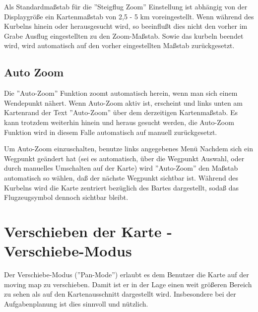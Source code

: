 Als Standardmaßstab für die ''Steigflug Zoom'' Einstellung ist abhängig  von der Displaygröße ein Kartenmaßstab von 2,5 - 5 km voreingestellt.
Wenn während des Kurbelns hinein oder herausgesucht wird, so beeinflußt dies nicht den vorher im Grabe Ausflug eingestellten zu den Zoom-Maßstab. Sowie das kurbeln beendet wird, wird automatisch auf den vorher eingestellten Maßstab zurückgesetzt.
\subsection*{Auto Zoom}\label{sec:AutoZoom}
Die ''Auto-Zoom'' Funktion zoomt automatisch herein, wenn man sich einem Wendepunkt nähert.
Wenn Auto-Zoom aktiv ist, erscheint und links unten am Kartenrand der Text ''Auto-Zoom'' über dem derzeitigen Kartenmaßstab.
Es kann trotzdem weiterhin hinein und heraus gesucht werden, die Auto-Zoom Funktion wird in diesem Falle automatisch auf manuell zurückgesetzt.

Um Auto-Zoom einzuschalten, benutze links angegebenes Menü
Nachdem sich ein Wegpunkt geändert hat (sei es automatisch, über die Wegpunkt Auswahl, oder durch manuelles Umschalten auf der Karte) wird ''Auto-Zoom'' den Maßstab automatisch so wählen, daß der nächste Wegpunkt sichtbar ist. Während des Kurbelns wird die Karte zentriert bezüglich des Bartes dargestellt, sodaß das Flugzeugsymbol dennoch sichtbar bleibt.

\section{Verschieben der Karte - Verschiebe-Modus}

Der Verschiebe-Modus (''Pan-Mode'') erlaubt es dem Benutzer die Karte auf der moving map zu verschieben. Damit ist er in der Lage einen weit größeren Bereich zu sehen als auf den Kartenausschnitt dargestellt wird. Insbesondere bei der Aufgabenplanung ist dies sinnvoll und nützlich.



 
